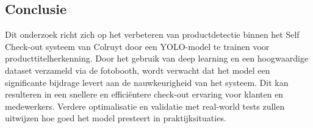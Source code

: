 \subsection{Conclusie}
Dit onderzoek richt zich op het verbeteren van productdetectie binnen het Self Check-out systeem van Colruyt door een YOLO-model te trainen voor producttitelherkenning. Door het gebruik van deep learning en een hoogwaardige dataset verzameld via de fotobooth, wordt verwacht dat het model een significante bijdrage levert aan de nauwkeurigheid van het systeem. Dit kan resulteren in een snellere en efficiëntere check-out ervaring voor klanten en medewerkers. Verdere optimalisatie en validatie met real-world tests zullen uitwijzen hoe goed het model presteert in praktijksituaties.